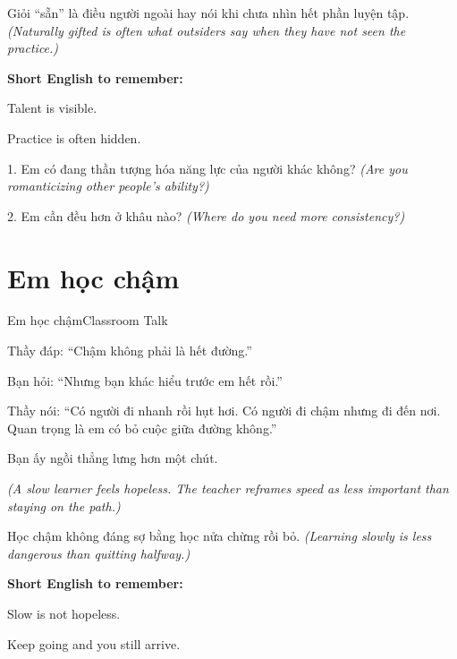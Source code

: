 \begin{baihoc}
Giỏi ``sẵn'' là điều người ngoài hay nói khi chưa nhìn hết phần luyện tập.
\textit{(Naturally gifted is often what outsiders say when they have not seen the practice.)}
\end{baihoc}

\begin{ghinhoanh}
\textbf{Short English to remember:}

Talent is visible.

Practice is often hidden.
\end{ghinhoanh}

\begin{tuhocnhanh}
1. Em có đang thần tượng hóa năng lực của người khác không? \textit{(Are you romanticizing other people's ability?)}

2. Em cần đều hơn ở khâu nào? \textit{(Where do you need more consistency?)}
\end{tuhocnhanh}
\ngancach

\section{Em học chậm}
\begin{truyen}{Em học chậm}{Classroom Talk}

Thầy đáp: ``Chậm không phải là hết đường.''

Bạn hỏi: ``Nhưng bạn khác hiểu trước em hết rồi.''

Thầy nói: ``Có người đi nhanh rồi hụt hơi. Có người đi chậm nhưng đi đến nơi. Quan trọng là em có bỏ cuộc giữa đường không.''

Bạn ấy ngồi thẳng lưng hơn một chút.

\textit{(A slow learner feels hopeless. The teacher reframes speed as less important than staying on the path.)}
\end{truyen}

\begin{baihoc}
Học chậm không đáng sợ bằng học nửa chừng rồi bỏ.
\textit{(Learning slowly is less dangerous than quitting halfway.)}
\end{baihoc}

\begin{ghinhoanh}
\textbf{Short English to remember:}

Slow is not hopeless.

Keep going and you still arrive.
\end{ghinhoanh}

